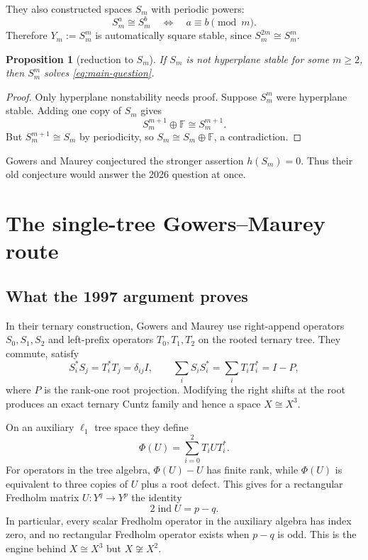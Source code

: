 \documentclass[11pt]{article}
\newtheorem{proposition}[theorem]{Proposition}
\theoremstyle{definition}
\theoremstyle{remark}
\newcommand{\F}{\mathbb F}
\newcommand{\ind}{\operatorname{ind}}
\begin{document}
They also constructed spaces $S_m$ with periodic powers:
\[
 S_m^a\cong S_m^b\quad\Longleftrightarrow\quad a\equiv b\pmod m.
\]
Therefore $Y_m:=S_m^m$ is automatically square stable, since
$S_m^{2m}\cong S_m^m$.

\begin{proposition}[reduction to $S_m$]\label{prop:Sm-reduction}
If $S_m$ is not hyperplane stable for some $m\ge2$, then $S_m^m$ solves
\eqref{eq:main-question}.
\end{proposition}

\begin{proof}
Only hyperplane nonstability needs proof.  Suppose $S_m^m$ were hyperplane
stable.  Adding one copy of $S_m$ gives
\[
 S_m^{m+1}\oplus\F\cong S_m^{m+1}.
\]
But $S_m^{m+1}\cong S_m$ by periodicity, so $S_m\cong S_m\oplus\F$, a
contradiction.
\end{proof}

Gowers and Maurey conjectured the stronger assertion $h(S_m)=0$.  Thus their
old conjecture would answer the 2026 question at once.

\section{The single-tree Gowers--Maurey route}

\subsection{What the 1997 argument proves}

In their ternary construction, Gowers and Maurey use right-append operators
$S_0,S_1,S_2$ and left-prefix operators $T_0,T_1,T_2$ on the rooted ternary
tree.  They commute, satisfy
\[
 S_i^*S_j=T_i^*T_j=\delta_{ij}I,
 \qquad
 \sum_iS_iS_i^*=\sum_iT_iT_i^*=I-P,
\]
where $P$ is the rank-one root projection.  Modifying the right shifts at the
root produces an exact ternary Cuntz family and hence a space $X\cong X^3$.

On an auxiliary $\ell_1$ tree space they define
\[
 \Phi(U)=\sum_{i=0}^2 T_iUT_i^*.
\]
For operators in the tree algebra, $\Phi(U)-U$ has finite rank, while
$\Phi(U)$ is equivalent to three copies of $U$ plus a root defect.  This gives
for a rectangular Fredholm matrix $U:Y^q\to Y^p$ the identity
\[
 2\ind U=p-q.
\]
In particular, every scalar Fredholm operator in the auxiliary algebra has
index zero, and no rectangular Fredholm operator exists when $p-q$ is odd.
This is the engine behind $X\cong X^3$ but $X\not\cong X^2$.
\end{document}
